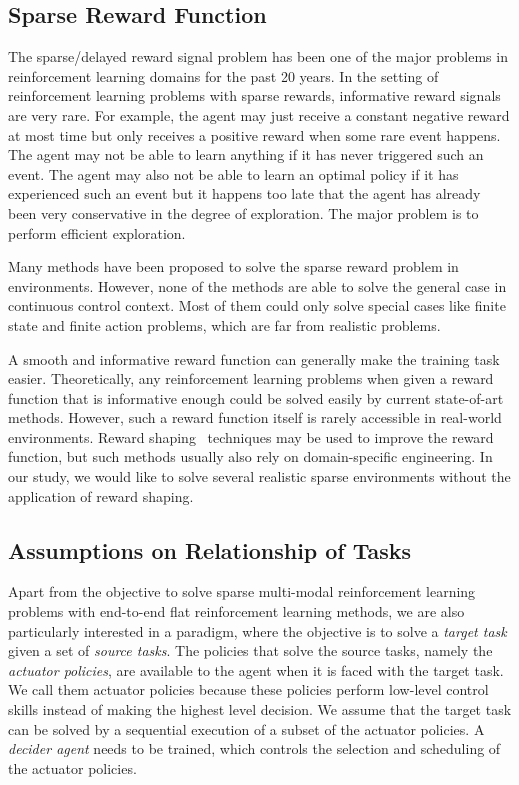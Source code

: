 \subsection{Sparse Reward Function}
The sparse/delayed reward signal problem has been one of the major problems in reinforcement learning domains for the past 20 years. In the setting of reinforcement learning problems with sparse rewards, informative reward signals are very rare. For example, the agent may just receive a constant negative reward at most time but only receives a positive reward when some rare event happens. The agent may not be able to learn anything if it has never triggered such an event. The agent may also not be able to learn an optimal policy if it has experienced such an event but it happens too late that the agent has already been very conservative in the degree of exploration. The major problem is to perform efficient exploration.

Many methods have been proposed to solve the sparse reward problem in environments. However, none of the methods are able to solve the general case in continuous control context. Most of them could only solve special cases like finite state and finite action problems, which are far from realistic problems.

A smooth and informative reward function can generally make the training task easier. Theoretically, any reinforcement learning problems when given a reward function that is informative enough could be solved easily by current state-of-art methods. However, such a reward function itself is rarely accessible in real-world environments. Reward shaping~\cite{ng1999policy} techniques may be used to improve the reward function, but such methods usually also rely on domain-specific engineering. In our study, we would like to solve several realistic sparse environments without the application of reward shaping.


\subsection{Assumptions on Relationship of Tasks}
Apart from the objective to solve sparse multi-modal reinforcement learning problems with end-to-end flat reinforcement learning methods, we are also particularly interested in a paradigm, where the objective is to solve a \textit{target task} given a set of \textit{source tasks}. The policies that solve the source tasks, namely the \textit{actuator policies}, are available to the agent when it is faced with the target task. We call them actuator policies because these policies perform low-level control skills instead of making the highest level decision. We assume that the target task can be solved by a sequential execution of a subset of the actuator policies. A \textit{decider agent} needs to be trained, which controls the selection and scheduling of the actuator policies.

